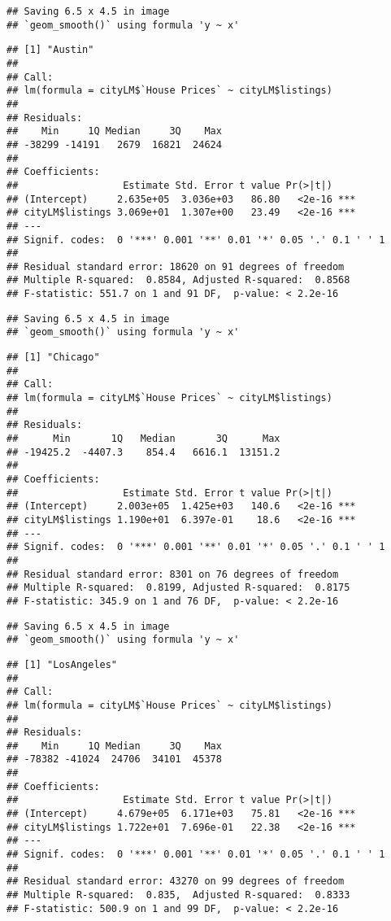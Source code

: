 \documentclass[
]{article}
\begin{document}
\begin{verbatim}
## Saving 6.5 x 4.5 in image
## `geom_smooth()` using formula 'y ~ x'
\end{verbatim}

\begin{verbatim}
## [1] "Austin"
## 
## Call:
## lm(formula = cityLM$`House Prices` ~ cityLM$listings)
## 
## Residuals:
##    Min     1Q Median     3Q    Max 
## -38299 -14191   2679  16821  24624 
## 
## Coefficients:
##                  Estimate Std. Error t value Pr(>|t|)    
## (Intercept)     2.635e+05  3.036e+03   86.80   <2e-16 ***
## cityLM$listings 3.069e+01  1.307e+00   23.49   <2e-16 ***
## ---
## Signif. codes:  0 '***' 0.001 '**' 0.01 '*' 0.05 '.' 0.1 ' ' 1
## 
## Residual standard error: 18620 on 91 degrees of freedom
## Multiple R-squared:  0.8584, Adjusted R-squared:  0.8568 
## F-statistic: 551.7 on 1 and 91 DF,  p-value: < 2.2e-16
\end{verbatim}

\begin{verbatim}
## Saving 6.5 x 4.5 in image
## `geom_smooth()` using formula 'y ~ x'
\end{verbatim}

\begin{verbatim}
## [1] "Chicago"
## 
## Call:
## lm(formula = cityLM$`House Prices` ~ cityLM$listings)
## 
## Residuals:
##      Min       1Q   Median       3Q      Max 
## -19425.2  -4407.3    854.4   6616.1  13151.2 
## 
## Coefficients:
##                  Estimate Std. Error t value Pr(>|t|)    
## (Intercept)     2.003e+05  1.425e+03   140.6   <2e-16 ***
## cityLM$listings 1.190e+01  6.397e-01    18.6   <2e-16 ***
## ---
## Signif. codes:  0 '***' 0.001 '**' 0.01 '*' 0.05 '.' 0.1 ' ' 1
## 
## Residual standard error: 8301 on 76 degrees of freedom
## Multiple R-squared:  0.8199, Adjusted R-squared:  0.8175 
## F-statistic: 345.9 on 1 and 76 DF,  p-value: < 2.2e-16
\end{verbatim}

\begin{verbatim}
## Saving 6.5 x 4.5 in image
## `geom_smooth()` using formula 'y ~ x'
\end{verbatim}

\begin{verbatim}
## [1] "LosAngeles"
## 
## Call:
## lm(formula = cityLM$`House Prices` ~ cityLM$listings)
## 
## Residuals:
##    Min     1Q Median     3Q    Max 
## -78382 -41024  24706  34101  45378 
## 
## Coefficients:
##                  Estimate Std. Error t value Pr(>|t|)    
## (Intercept)     4.679e+05  6.171e+03   75.81   <2e-16 ***
## cityLM$listings 1.722e+01  7.696e-01   22.38   <2e-16 ***
## ---
## Signif. codes:  0 '***' 0.001 '**' 0.01 '*' 0.05 '.' 0.1 ' ' 1
## 
## Residual standard error: 43270 on 99 degrees of freedom
## Multiple R-squared:  0.835,  Adjusted R-squared:  0.8333 
## F-statistic: 500.9 on 1 and 99 DF,  p-value: < 2.2e-16
\end{verbatim}
\end{document}
